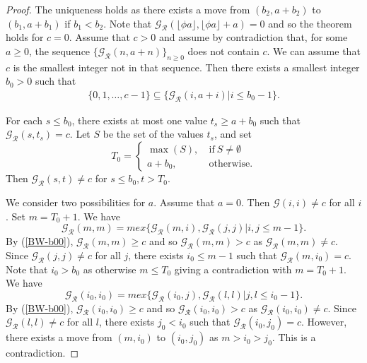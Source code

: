 \documentclass[12pt]{amsart}
\theoremstyle{plain}
\theoremstyle{definition}
\theoremstyle{remark}
\begin{document}
\begin{proof}
The uniqueness holds as there exists a move from $(b_2,a+b_2)$ to $(b_1,a+b_1)$ if $b_1 < b_2$. Note that ${\mathcal{G}}_{\mathcal{R}}(\lfloor \phi a \rfloor,\lfloor \phi a \rfloor+a) = 0$ and so the theorem holds for $c = 0$. Assume that $c > 0$ and assume by contradiction that, for some $a \geq 0$, the sequence $\{{\mathcal{G}}_{\mathcal{R}}(n,a+n)\}_{n \geq 0}$ does not contain $c$. We can assume that $c$ is the smallest integer not in that sequence. Then there exists a smallest integer $b_0 > 0$ such that
\begin{align} \label{BW-b00}
\{0,1,\ldots, c-1\} \subseteq \{{\mathcal{G}}_{\mathcal{R}}(i,a+i) | i \leq b_0-1\}.
\end{align}

For each $s \leq b_0$, there exists at most one value $t_s \geq a+b_0$ such that ${\mathcal{G}}_{\mathcal{R}}(s,t_s) = c$. Let $S$ be the set of the values $t_s$, and set
\[
T_0 = \begin{cases}\max(S),&\ \text{if}\ S\not=\emptyset\\
a+b_0, &\ \text{otherwise}.
\end{cases}
\]
Then ${\mathcal{G}}_{\mathcal{R}}(s,t) \neq c$ for $s \leq b_0, t > T_0$.

We consider two possibilities for $a$. Assume that $a = 0$. Then ${\mathcal{G}}(i,i) \neq c$ for all $i$. Set $m = T_0+1$. We have
\[
{\mathcal{G}}_{\mathcal{R}}(m,m) = mex\{{\mathcal{G}}_{\mathcal{R}}(m,i), {\mathcal{G}}_{\mathcal{R}}(j,j) | i, j \leq m-1\}.
\]
By (\ref{BW-b00}), ${\mathcal{G}}_{\mathcal{R}}(m,m) \geq c$ and so ${\mathcal{G}}_{\mathcal{R}}(m,m) > c$ as ${\mathcal{G}}_{\mathcal{R}}(m,m) \neq c$. Since ${\mathcal{G}}_{\mathcal{R}}(j,j) \neq c$ for all $j$, there exists $i_0 \leq m-1$ such that ${\mathcal{G}}_{\mathcal{R}}(m,i_0) = c$. Note that $i_0 > b_0$ as otherwise $m \leq T_0$ giving a contradiction with $m = T_0+1$. We have
\[
{\mathcal{G}}_{\mathcal{R}}(i_0,i_0) = mex\{{\mathcal{G}}_{\mathcal{R}}(i_0,j), {\mathcal{G}}_{\mathcal{R}}(l,l) | j,l \leq i_0-1\}.
\]
By (\ref{BW-b00}), ${\mathcal{G}}_{\mathcal{R}}(i_0,i_0) \geq c$ and so ${\mathcal{G}}_{\mathcal{R}}(i_0,i_0) > c$ as ${\mathcal{G}}_{\mathcal{R}}(i_0,i_0) \neq c$. Since ${\mathcal{G}}_{\mathcal{R}}(l,l) \neq c$ for all $l$, there exists $j_0 < i_0$ such that ${\mathcal{G}}_{\mathcal{R}}(i_0,j_0) = c$. However, there exists a move from $(m,i_0)$ to $(i_0,j_0)$ as $m > i_0 > j_0$. This is a contradiction.


\end{proof}
\end{document}
